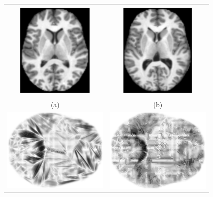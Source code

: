 \documentclass[twoside,11pt]{article}
\begin{document}
\begin{figure}[bth]
\centering
\begin{tabular}{cc}
                       \vspace{-0.1in} \\
\includegraphics[height=0.375\linewidth,angle=0]{slice00000} &
\includegraphics[height=0.375\linewidth,angle=0]{slice00001} \\
                       \vspace{-0.1in} \\
                   (a) & (b) \\
\includegraphics[width=0.375\linewidth,angle=90]{brains-p1-map-v2} &
\includegraphics[width=0.375\linewidth,angle=90]{brains-p2-map-v2} \\

\end{tabular}
\end{figure}
\end{document}
